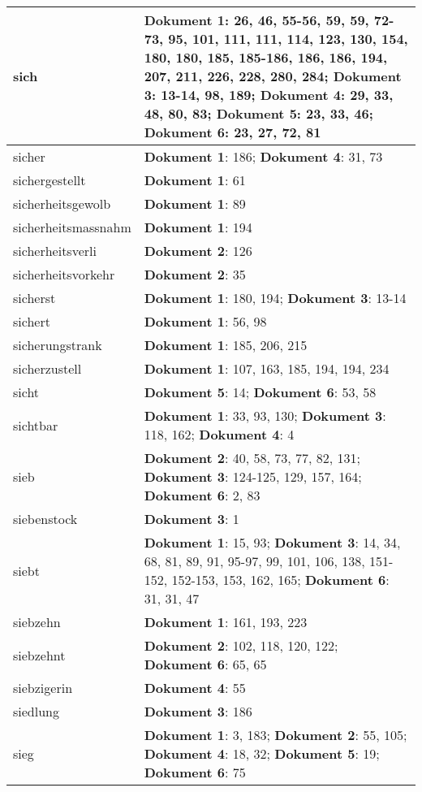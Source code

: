 \documentclass[a5paper]{article}
\begin{document}
\begin{longtable}[l]{|l|p{3in}|}
\hline
sich & \textbf{Dokument 1}: 26, 46, 55-56, 59, 59, 72-73, 95, 101, 111, 111, 114, 123, 130, 154, 180, 180, 185, 185-186, 186, 186, 194, 207, 211, 226, 228, 280, 284; \textbf{Dokument 3}: 13-14, 98, 189; \textbf{Dokument 4}: 29, 33, 48, 80, 83; \textbf{Dokument 5}: 23, 33, 46; \textbf{Dokument 6}: 23, 27, 72, 81 \\
\hline
sicher & \textbf{Dokument 1}: 186; \textbf{Dokument 4}: 31, 73 \\
\hline
sichergestellt & \textbf{Dokument 1}: 61 \\
\hline
sicherheitsgewolb & \textbf{Dokument 1}: 89 \\
\hline
sicherheitsmassnahm & \textbf{Dokument 1}: 194 \\
\hline
sicherheitsverli & \textbf{Dokument 2}: 126 \\
\hline
sicherheitsvorkehr & \textbf{Dokument 2}: 35 \\
\hline
sicherst & \textbf{Dokument 1}: 180, 194; \textbf{Dokument 3}: 13-14 \\
\hline
sichert & \textbf{Dokument 1}: 56, 98 \\
\hline
sicherungstrank & \textbf{Dokument 1}: 185, 206, 215 \\
\hline
sicherzustell & \textbf{Dokument 1}: 107, 163, 185, 194, 194, 234 \\
\hline
sicht & \textbf{Dokument 5}: 14; \textbf{Dokument 6}: 53, 58 \\
\hline
sichtbar & \textbf{Dokument 1}: 33, 93, 130; \textbf{Dokument 3}: 118, 162; \textbf{Dokument 4}: 4 \\
\hline
sieb & \textbf{Dokument 2}: 40, 58, 73, 77, 82, 131; \textbf{Dokument 3}: 124-125, 129, 157, 164; \textbf{Dokument 6}: 2, 83 \\
\hline
siebenstock & \textbf{Dokument 3}: 1 \\
\hline
siebt & \textbf{Dokument 1}: 15, 93; \textbf{Dokument 3}: 14, 34, 68, 81, 89, 91, 95-97, 99, 101, 106, 138, 151-152, 152-153, 153, 162, 165; \textbf{Dokument 6}: 31, 31, 47 \\
\hline
siebzehn & \textbf{Dokument 1}: 161, 193, 223 \\
\hline
siebzehnt & \textbf{Dokument 2}: 102, 118, 120, 122; \textbf{Dokument 6}: 65, 65 \\
\hline
siebzigerin & \textbf{Dokument 4}: 55 \\
\hline
siedlung & \textbf{Dokument 3}: 186 \\
\hline
sieg & \textbf{Dokument 1}: 3, 183; \textbf{Dokument 2}: 55, 105; \textbf{Dokument 4}: 18, 32; \textbf{Dokument 5}: 19; \textbf{Dokument 6}: 75 \\

\end{longtable}
\end{document}
